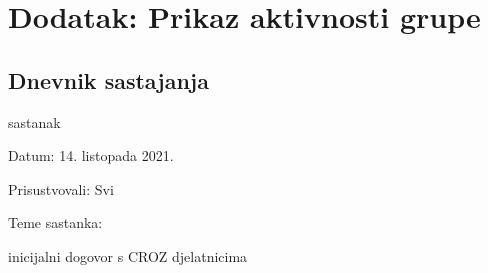 \chapter*{Dodatak: Prikaz aktivnosti grupe}
		
		\section*{Dnevnik sastajanja}
		
		
		\begin{packed_enum}
			\item  sastanak
			
			\item[] \begin{packed_item}
				\item Datum: 14. listopada 2021.
				\item Prisustvovali: Svi
				\item Teme sastanka:
				\begin{packed_item}
					\item  inicijalni dogovor s CROZ djelatnicima
				\end{packed_item}
			\end{packed_item}
			

\end{packed_enum}
